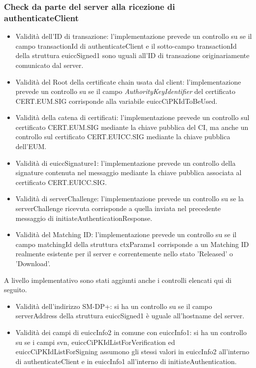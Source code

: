 \documentclass[10pt, oneside]{book}
\begin{document}
\subsubsection{Check da parte del server alla ricezione di authenticateClient}
\begin{itemize}
\item Validità dell'ID di transazione: l'implementazione prevede un controllo su se il campo transactionId di authenticateClient e il sotto-campo transactionId della struttura euiccSigned1 sono uguali all'ID di transazione originariamente comunicato dal server.
\item Validità del Root della certificate chain usata dal client: l'implementazione prevede un controllo su se il campo \textit{AuthorityKeyIdentifier} del certificato CERT.EUM.SIG corrisponde alla variabile euiccCiPKIdToBeUsed.
\item Validità della catena di certificati: l'implementazione prevede un controllo sul certificato CERT.EUM.SIG mediante la chiave pubblica del CI, ma anche un controllo sul certificato CERT.EUICC.SIG mediante la chiave pubblica dell'EUM.
\item Validità di euiccSignature1: l'implementazione prevede un controllo della signature contenuta nel messaggio mediante la chiave pubblica associata al certificato CERT.EUICC.SIG.
\item Validità di serverChallenge: l'implementazione prevede un controllo su se la serverChallenge ricevuta corrisponde a quella inviata nel precedente messaggio di initiateAuthenticationResponse.
\item Validità del Matching ID: l'implementazione prevede un controllo su se il campo matchingId della struttura ctxParams1 corrisponde a un Matching ID realmente esistente per il server e correntemente nello stato 'Released' o 'Download'.
\end{itemize}
A livello implementativo sono stati aggiunti anche i controlli elencati qui di seguito.
\begin{itemize}
\item Validità dell'indirizzo SM-DP+: si ha un controllo su se il campo serverAddress della struttura euiccSigned1 è uguale all'hostname del server.
\item Validità dei campi di euiccInfo2 in comune con euiccInfo1: si ha un controllo su se i campi svn, euiccCiPKIdListForVerification ed euiccCiPKIdListForSigning assumono gli stessi valori in euiccInfo2 all'interno di authenticateClient e in euiccInfo1 all'interno di initiateAuthentication.
\end{itemize}
\end{document}
